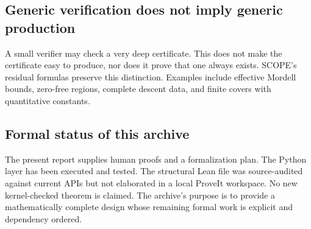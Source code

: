 \subsection{Generic verification does not imply generic production}

A small verifier may check a very deep certificate.  This does not make the certificate easy to produce, nor does it prove that one always exists.  SCOPE's residual formulas preserve this distinction.  Examples include effective Mordell bounds, zero-free regions, complete descent data, and finite covers with quantitative constants.

\subsection{Formal status of this archive}

The present report supplies human proofs and a formalization plan.  The Python layer has been executed and tested.  The structural Lean file was source-audited against current APIs but not elaborated in a local ProveIt workspace.  No new kernel-checked theorem is claimed.  The archive's purpose is to provide a mathematically complete design whose remaining formal work is explicit and dependency ordered.
